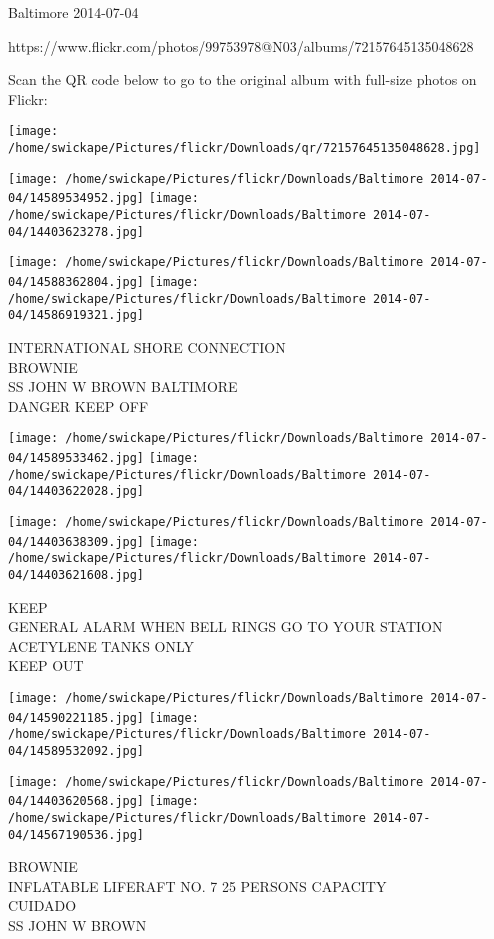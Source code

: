 \documentclass[10pt,letterpaper]{article}
\begin{document}
Baltimore 2014-07-04

https://www.flickr.com/photos/99753978@N03/albums/72157645135048628

Scan the QR code below to go to the original album with full-size photos on Flickr:

\texttt{[image: /home/swickape/Pictures/flickr/Downloads/qr/72157645135048628.jpg]}
\pagebreak

\texttt{[image: /home/swickape/Pictures/flickr/Downloads/Baltimore 2014-07-04/14589534952.jpg]}
\texttt{[image: /home/swickape/Pictures/flickr/Downloads/Baltimore 2014-07-04/14403623278.jpg]}

\texttt{[image: /home/swickape/Pictures/flickr/Downloads/Baltimore 2014-07-04/14588362804.jpg]}
\texttt{[image: /home/swickape/Pictures/flickr/Downloads/Baltimore 2014-07-04/14586919321.jpg]}

INTERNATIONAL SHORE CONNECTION\\
BROWNIE\\
SS JOHN W BROWN BALTIMORE\\
DANGER KEEP OFF
\pagebreak

\texttt{[image: /home/swickape/Pictures/flickr/Downloads/Baltimore 2014-07-04/14589533462.jpg]}
\texttt{[image: /home/swickape/Pictures/flickr/Downloads/Baltimore 2014-07-04/14403622028.jpg]}

\texttt{[image: /home/swickape/Pictures/flickr/Downloads/Baltimore 2014-07-04/14403638309.jpg]}
\texttt{[image: /home/swickape/Pictures/flickr/Downloads/Baltimore 2014-07-04/14403621608.jpg]}

KEEP\\
GENERAL ALARM WHEN BELL RINGS GO TO YOUR STATION\\
ACETYLENE TANKS ONLY\\
KEEP OUT
\pagebreak

\texttt{[image: /home/swickape/Pictures/flickr/Downloads/Baltimore 2014-07-04/14590221185.jpg]}
\texttt{[image: /home/swickape/Pictures/flickr/Downloads/Baltimore 2014-07-04/14589532092.jpg]}

\texttt{[image: /home/swickape/Pictures/flickr/Downloads/Baltimore 2014-07-04/14403620568.jpg]}
\texttt{[image: /home/swickape/Pictures/flickr/Downloads/Baltimore 2014-07-04/14567190536.jpg]}

BROWNIE\\
INFLATABLE LIFERAFT NO. 7 25 PERSONS CAPACITY\\
CUIDADO\\
SS JOHN W BROWN
\pagebreak
\end{document}
